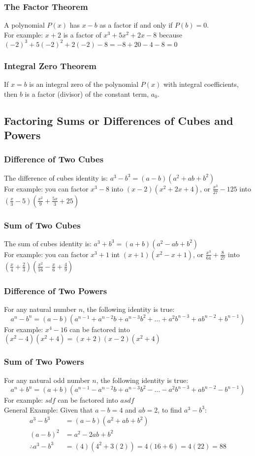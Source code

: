 \documentclass{article}
\begin{document}
	\subsubsection{The Factor Theorem}
	A polynomial $P(x)$ has $x-b$ as a factor if and only if $P(b)=0$.\\
	For example: $x+2$ is a factor of $x^3+5x^2+2x-8$ because $(-2)^3+5(-2)^2+2(-2)-8=-8+20-4-8=0$
	\subsubsection{Integral Zero Theorem}
	If $x=b$ is an integral zero of the polynomial $P(x)$ with integral coefficients, then $b$ is a factor (divisor) of the constant term, $a_0$.
	\subsection{Factoring Sums or Differences of Cubes and Powers}
	\subsubsection{Difference of Two Cubes}
	The difference of cubes identity is: $a^3-b^3=(a-b)(a^2+ab+b^2)$\\
	For example: you can factor $x^3-8$ into $(x-2)(x^2+2x+4)$, or $\frac{x^3}{27}-125$ into $(\frac{x}{3}-5)(\frac{x^2}{9}+\frac{5x}{3}+25)$
	\subsubsection{Sum of Two Cubes}
	The sum of cubes identity is: $a^3+b^3=(a+b)(a^2-ab+b^2)$\\
	For example: you can factor $x^3+1$ int $(x+1)(x^2-x+1)$, or $\frac{x^3}{64}+\frac{8}{27}$ into $(\frac{x}{4}+\frac{2}{3})(\frac{x^2}{16}-\frac{x}{6}+\frac{4}{9})$
	\subsubsection{Difference of Two Powers}
	For any natural number $n$, the following identity is true: \[a^n-b^n=(a-b)(a^{n-1}+a^{n-2}b+a^{n-3}b^2+\dots+a^2b^{n-3}+ab^{n-2}+b^{n-1})\]
	For example: $x^4-16$ can be factored into $(x^2-4)(x^2+4)=(x+2)(x-2)(x^2+4)$
	\subsubsection{Sum of Two Powers}
	For any natural odd number $n$, the following identity is true: \[a^n+b^n=(a+b)(a^{n-1}-a^{n-2}b+a^{n-3}b^2-\dots-a^2b^{n-3}+ab^{n-2}-b^{n-1})\]
	For example: $sdf$ can be factored into $asdf$
	\vspace{.5ex}\\
	General Example: Given that $a-b=4$ and $ab=2$, to find $a^3-b^3$:\\
	\begin{align*}
		a^3-b^3&=(a-b)(a^2+ab+b^2)\\
		(a-b)^2&=a^2-2ab+b^2\\
		\therefore a^3-b^3&=(4)(4^2+3(2))=4(16+6)=4(22)=88
	\end{align*}
	\vspace{-2ex}
	\setcounter{section}{4}
	\setcounter{subsection}{1}
\end{document}
